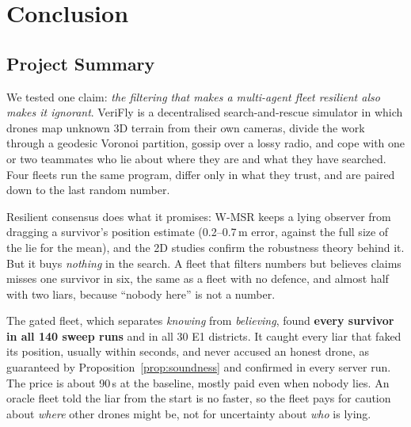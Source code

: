 \chapter[Conclusion]{Conclusion}
\label{cp:Conclusion}

\parindent0pt

\section{Project Summary}

We tested one claim: \emph{the filtering that makes a multi-agent fleet resilient also makes it ignorant}. VeriFly is a
decentralised search-and-rescue simulator in which drones map unknown 3D terrain from their own cameras, divide the work
through a geodesic Voronoi partition, gossip over a lossy radio, and cope with one or two teammates who lie about where
they are and what they have searched. Four fleets run the same program, differ only in what they trust, and are paired
down to the last random number.

Resilient consensus does what it promises: W-MSR keeps a lying observer from dragging a survivor's position estimate
(0.2--0.7\,m error, against the full size of the lie for the mean), and the 2D studies confirm the robustness theory
behind it. But it buys \emph{nothing} in the search. A fleet that filters numbers but believes claims misses one
survivor in six, the same as a fleet with no defence, and almost half with two liars, because ``nobody here'' is not a
number.

The gated fleet, which separates \emph{knowing} from \emph{believing}, found \textbf{every survivor in all 140 sweep
runs} and in all 30 E1 districts. It caught every liar that faked its position, usually within seconds, and never
accused an honest drone, as guaranteed by Proposition~\ref{prop:soundness} and confirmed in every server run. The price
is about 90\,s at the baseline, mostly paid even when nobody lies. An oracle fleet told the liar from the start is no
faster, so the fleet pays for caution about \emph{where} other drones might be, not for uncertainty about \emph{who}
is lying.

